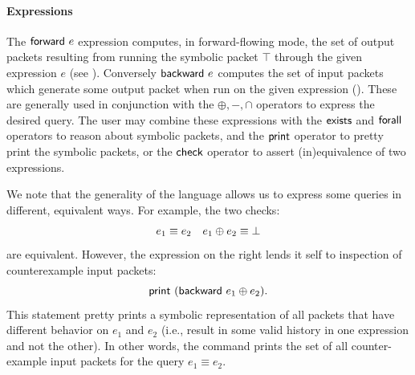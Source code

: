 \documentclass[acmsmall,dvipsnames,nonacm]{acmart}
\begin{document}
\paragraph*{Expressions}
The $\textsf{forward}\ e$ expression computes, in forward-flowing mode, the set of
output packets resulting from running the symbolic packet $\top$ through the given
expression $e$ (see ). Conversely $\textsf{backward}\ e$ computes the set of input packets which
generate some output packet when run on the given expression ().
These are generally used in conjunction with the $\oplus, -, \cap$ operators to
express the desired query. The user may combine these expressions with the
$\textsf{exists}$ and $\textsf{forall}$ operators to reason about symbolic packets, and the
$\textsf{print}$ operator to pretty print the symbolic packets, or the $\textsf{check}$
operator to assert (in)equivalence of two expressions.

We note that the generality of the language allows us to express some queries in
different, equivalent ways. For example, the two checks:
\begin{align*}
e_1 \equiv e_2 && e_1 \oplus e_2 \equiv \bot
\end{align*}
are equivalent. However, the expression on the right lends it self to
inspection of counterexample input packets:
\[ \textsf{print}\ (\textsf{backward}\ e_1 \oplus e_2). \]
This statement pretty prints a symbolic representation of all packets that have
different behavior on $e_1$ and $e_2$ (i.e., result in some valid history in one
expression and not the other). In other words, the command prints the set of all
counter-example input packets for the query $e_1 \equiv e_2$.

\end{document}
